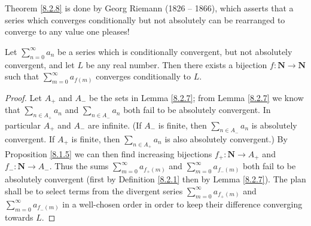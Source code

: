 \begin{note}
    Theorem \ref{8.2.8} is done by Georg Riemann (1826 -- 1866), which asserts that a series which converges conditionally but not absolutely can be rearranged to converge to any value one pleases!
\end{note}

\begin{theorem}\label{8.2.8}
    Let \(\sum_{n = 0}^\infty a_n\) be a series which is conditionally convergent, but not absolutely convergent, and let \(L\) be any real number.
    Then there exists a bijection \(f : \mathbf{N} \to \mathbf{N}\) such that \(\sum_{m = 0}^\infty a_{f(m)}\) converges conditionally to \(L\).
\end{theorem}

\begin{proof}
    Let \(A_+\) and \(A_-\) be the sets in Lemma \ref{8.2.7};
    from Lemma \ref{8.2.7} we know that \(\sum_{n \in A_+} a_n\) and \(\sum_{n \in A_-} a_n\) both fail to be absolutely convergent.
    In particular \(A_+\) and \(A_-\) are infinite.
    (If \(A_-\) is finite, then \(\sum_{n \in A_-} a_n\) is absolutely convergent.
    If \(A_+\) is finite, then \(\sum_{n \in A_+} a_n\) is also absolutely convergent.)
    By Proposition \ref{8.1.5} we can then find increasing bijections \(f_+ : \mathbf{N} \to A_+\) and \(f_- : \mathbf{N} \to A_-\).
    Thus the sums \(\sum_{m = 0}^\infty a_{f_+(m)}\) and \(\sum_{m = 0}^\infty a_{f_-(m)}\) both fail to be absolutely convergent (first by Definition \ref{8.2.1} then by Lemma \ref{8.2.7}).
    The plan shall be to select terms from the divergent series \(\sum_{m = 0}^\infty a_{f_+(m)}\) and \(\sum_{m = 0}^\infty a_{f_-(m)}\) in a well-chosen order in order to keep their difference converging towards \(L\).


\end{proof}
